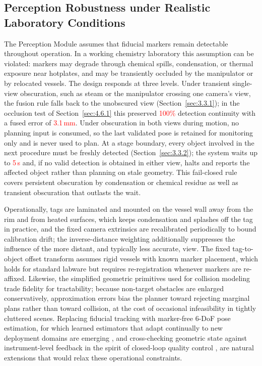 \documentclass{ieeeaccess}
\newif\ifhighlight
\newcommand{\rev}[1]{\ifhighlight\hl{#1}\else#1\fi}
\newcommand{\nd}[1]{\textcolor{red}{#1}}
\begin{document}
\subsection{Perception Robustness under Realistic Laboratory Conditions}\label{sec:5.2}
The Perception Module assumes that fiducial markers remain detectable throughout operation. In a working chemistry laboratory this assumption can be violated: markers may degrade through chemical spills, condensation, or thermal exposure near hotplates, and may be transiently occluded by the manipulator or by relocated vessels. \rev{The design responds at three levels.
Under transient single-view obscuration, such as steam or the manipulator crossing one camera's view, the fusion rule falls back to the unobscured view (Section~\ref{sec:3.3.1}); in the occlusion test of Section~\ref{sec:4.6.1} this preserved \nd{100\%} detection continuity with a fused error of \nd{3.1\,mm}.
Under obscuration in both views during motion, no planning input is consumed, so the last validated pose is retained for monitoring only and is never used to plan.
At a stage boundary, every object involved in the next procedure must be freshly detected (Section~\ref{sec:3.3.2}); the system waits up to \nd{5\,s} and, if no valid detection is obtained in either view, halts and reports the affected object rather than planning on stale geometry.
This fail-closed rule covers persistent obscuration by condensation or chemical residue as well as transient obscuration that outlasts the wait.}

\rev{Operationally, tags are laminated and mounted on the vessel wall away from the rim and from heated surfaces, which keeps condensation and splashes off the tag in practice, and the fixed camera extrinsics are recalibrated periodically to bound calibration drift}; the inverse-distance weighting additionally suppresses the influence of the more distant, and typically less accurate, view. The fixed tag-to-object offset transform assumes rigid vessels with known marker placement, which holds for standard labware but requires re-registration whenever markers are re-affixed. Likewise, the simplified geometric primitives used for collision modeling trade fidelity for tractability; because non-target obstacles are enlarged conservatively, approximation errors bias the planner toward rejecting marginal plans rather than toward collision, at the cost of occasional infeasibility in tightly cluttered scenes.
Replacing fiducial tracking with marker-free 6-DoF pose estimation\rev{, for which learned estimators that adapt continually to new deployment domains are emerging \cite{peng2026lifelong}}, and cross-checking geometric state against instrument-level feedback in the spirit of closed-loop quality control \cite{khan2025real}, are natural extensions that would relax these operational constraints.
\end{document}
